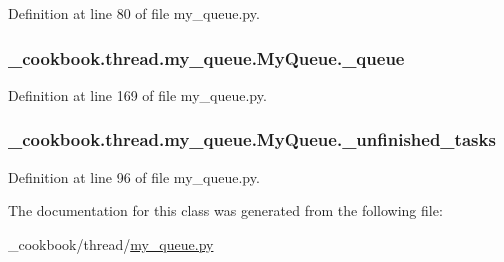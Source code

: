 Definition at line 80 of file my\-\_\-queue.\-py.

\hypertarget{class__cookbook_1_1thread_1_1my__queue_1_1MyQueue_ab96b072fd4230d0ba12b280cc302996a}{
\subsubsection[{\-\_\-queue}]{\setlength{\rightskip}{0pt plus 5cm}\-\_\-cookbook.\-thread.\-my\-\_\-queue.\-My\-Queue.\-\_\-queue\hspace{0.3cm}{\ttfamily [private]}}}\label{class__cookbook_1_1thread_1_1my__queue_1_1MyQueue_ab96b072fd4230d0ba12b280cc302996a}


Definition at line 169 of file my\-\_\-queue.\-py.

\hypertarget{class__cookbook_1_1thread_1_1my__queue_1_1MyQueue_a7ba895923806b0797c84dedb2eb6bbf9}{
\subsubsection[{\-\_\-unfinished\-\_\-tasks}]{\setlength{\rightskip}{0pt plus 5cm}\-\_\-cookbook.\-thread.\-my\-\_\-queue.\-My\-Queue.\-\_\-unfinished\-\_\-tasks\hspace{0.3cm}{\ttfamily [private]}}}\label{class__cookbook_1_1thread_1_1my__queue_1_1MyQueue_a7ba895923806b0797c84dedb2eb6bbf9}


Definition at line 96 of file my\-\_\-queue.\-py.



The documentation for this class was generated from the following file\-:\begin{DoxyCompactItemize}
\item 
\-\_\-cookbook/thread/\hyperlink{my__queue_8py}{my\-\_\-queue.\-py}\end{DoxyCompactItemize}

